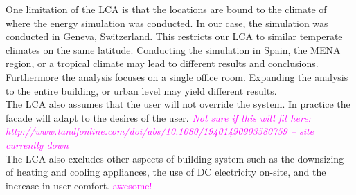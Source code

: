 One limitation of the LCA is that the locations are bound to the climate of where the energy simulation was conducted. In our case, the simulation was conducted in Geneva, Switzerland. This restricts our LCA to similar temperate climates on the same latitude. Conducting the simulation in Spain, the MENA region, or a tropical climate may lead to different results and conclusions. Furthermore the analysis focuses on a single office room. Expanding the analysis to the entire building, or urban level may yield different results.\\
The LCA also assumes that the user will not override the system. In practice the facade will adapt to the desires of the user. \textcolor{magenta}{\textit{Not sure if this will fit here: http://www.tandfonline.com/doi/abs/10.1080/19401490903580759 -- site currently down}}\\
The LCA also excludes other aspects of building system such as the downsizing of heating and cooling appliances, the use of DC electricity on-site, and the increase in user comfort.  \textcolor{magenta}{awesome!}



